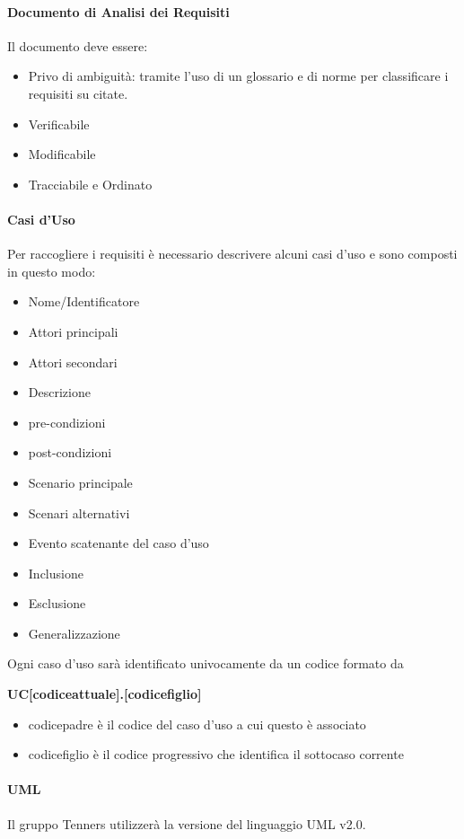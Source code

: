 \paragraph{Documento di Analisi dei Requisiti}
Il documento deve essere:
\begin{itemize}
  \item Privo di ambiguità: tramite l'uso di un glossario e di norme per classificare i requisiti su citate.
  \item Verificabile
  \item Modificabile
  \item Tracciabile e Ordinato
\end{itemize}
\paragraph{Casi d'Uso}
Per raccogliere i requisiti è necessario descrivere alcuni casi d'uso e sono composti in questo modo:
\begin{itemize}
  \item Nome/Identificatore
  \item Attori principali
  \item Attori secondari
  \item Descrizione
  \item pre-condizioni
  \item post-condizioni
  \item Scenario principale
  \item Scenari alternativi
  \item Evento scatenante del caso d’uso
  \item Inclusione
  \item Esclusione
  \item Generalizzazione
\end{itemize}
Ogni caso d'uso sarà identificato univocamente da un codice formato da

\centerline{\textbf{UC[codiceattuale].[codicefiglio]}}
\begin{itemize}
  \item codicepadre è il codice del caso d'uso a cui questo è associato
  \item codicefiglio è il codice progressivo che identifica il sottocaso corrente
\end{itemize}
\paragraph{UML}
Il gruppo Tenners utilizzerà la versione del linguaggio UML v2.0.
